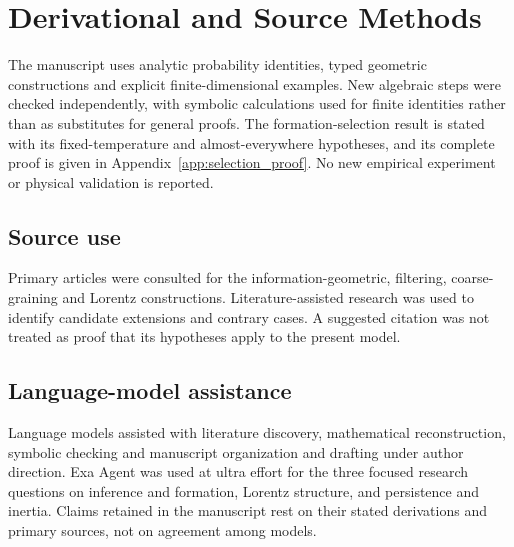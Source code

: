 \section{Derivational and Source Methods}\label{sec:methods}
\label{sec:methods_metagent}
The manuscript uses analytic probability identities, typed geometric constructions and explicit finite-dimensional examples. New algebraic steps were checked independently, with symbolic calculations used for finite identities rather than as substitutes for general proofs. The formation-selection result is stated with its fixed-temperature and almost-everywhere hypotheses, and its complete proof is given in Appendix~\ref{app:selection_proof}. No new empirical experiment or physical validation is reported.

\subsection{Source use}
Primary articles were consulted for the information-geometric, filtering, coarse-graining and Lorentz constructions. Literature-assisted research was used to identify candidate extensions and contrary cases. A suggested citation was not treated as proof that its hypotheses apply to the present model.

\subsection{Language-model assistance}
Language models assisted with literature discovery, mathematical reconstruction, symbolic checking and manuscript organization and drafting under author direction. Exa Agent was used at ultra effort for the three focused research questions on inference and formation, Lorentz structure, and persistence and inertia. Claims retained in the manuscript rest on their stated derivations and primary sources, not on agreement among models.

